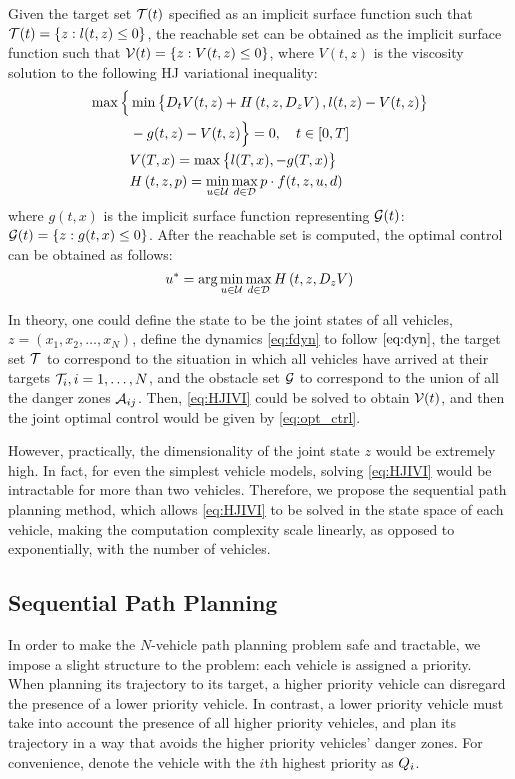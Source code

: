 Given the target set $\mathcal{T}(t)$ specified as an implicit surface function such that $\mathcal{T}(t) = \{z: l(t, z) \le 0\}$, the reachable set can be obtained as the implicit surface function such that $\mathcal{V}(t) = \{z: V(t, z) \le 0\}$, where $V(t, z)$ is the viscosity solution \cite{Crandall83} to the following HJ variational inequality:
%
\begin{equation}
\label{eq:HJIVI}
\begin{aligned}
\max\Big\{&\min\big\{D_t V(t, z) + H\left(t, z, D_z V\right), l(t,z) - V(t, z)\big\}\\
& -g(t, z) - V(t, z)\Big\} = 0, \quad t\in[0,T]\\
&V(T, x) = \max\big\{l(T, x), -g(T, x)\big\} \\
&H\left(t, z, p\right) = \min_{u \in \mathcal{U}} \max_{d \in \mathcal{D}} p \cdot f(t, z, u, d)
\end{aligned}
\end{equation}
%
\noindent where $g(t, x)$ is the implicit surface function representing $\mathcal{G}(t)$: $\mathcal{G}(t) = \{z: g(t, x) \le 0\}$. After the reachable set is computed, the optimal control can be obtained as follows:
%
\begin{equation}
\label{eq:opt_ctrl}
u^* = \arg \min_{u \in \mathcal{U}} \max_{d \in \mathcal{D}} H\left(t, z, D_z V\right)
\end{equation}

In theory, one could define the state to be the joint states of all vehicles, $z = (x_1, x_2, \ldots, x_N)$, define the dynamics \eqref{eq:fdyn} to follow $\eqref{eq:dyn}$, the target set $\mathcal{T}$ to correspond to the situation in which all vehicles have arrived at their targets $\mathcal{T}_i, i = 1, \ldots, N$, and the obstacle set $\mathcal{G}$ to correspond to the union of all the danger zones $\mathcal{A}_{ij}$. Then, \eqref{eq:HJIVI} could be solved to obtain $\mathcal{V}(t)$, and then the joint optimal control would be given by \eqref{eq:opt_ctrl}.

However, practically, the dimensionality of the joint state $z$ would be extremely high. In fact, for even the simplest vehicle models, solving \eqref{eq:HJIVI} would be intractable for more than two vehicles. Therefore, we propose the sequential path planning method, which allows \eqref{eq:HJIVI} to be solved in the state space of each vehicle, making the computation complexity scale linearly, as opposed to exponentially, with the number of vehicles.

\subsection{Sequential Path Planning}
In order to make the $N$-vehicle path planning problem safe and tractable, we impose a slight structure to the problem: each vehicle is assigned a priority. When planning its trajectory to its target, a higher priority vehicle can disregard the presence of a lower priority vehicle. In contrast, a lower priority vehicle must take into account the presence of all higher priority vehicles, and plan its trajectory in a way that avoids the higher priority vehicles' danger zones. For convenience, denote the vehicle with the $i$th highest priority as $Q_i$.

